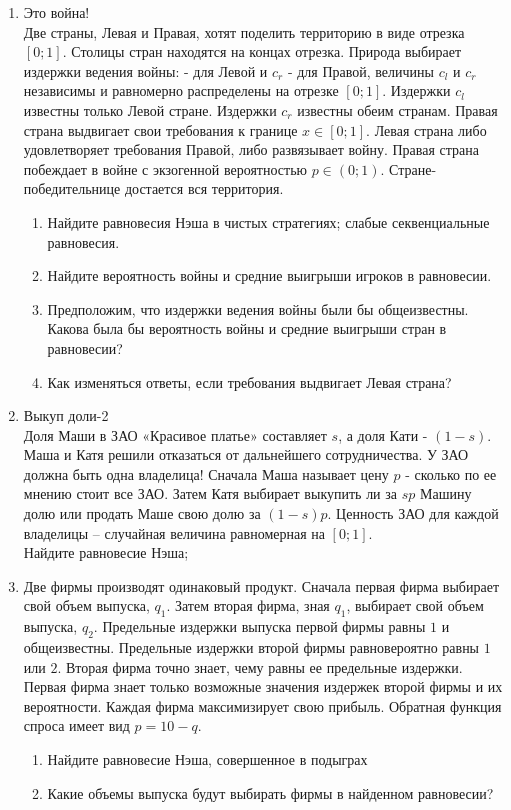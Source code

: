 \documentclass[pdftex,12pt,a4paper]{article}
\begin{document}
\begin{enumerate}
\item Это война!\\
Две страны, Левая и Правая, хотят поделить территорию в виде отрезка $\left[ {0;1} \right]$. Столицы стран находятся на концах отрезка. Природа выбирает издержки ведения войны:  - для Левой и $c_r $ - для Правой, величины $c_l $ и $c_r $ независимы и равномерно распределены на отрезке $\left[ {0;1} \right]$. Издержки $c_l $ известны только Левой стране. Издержки $c_r $ известны обеим странам. Правая страна выдвигает свои требования к границе $x \in \left[ {0;1} \right]$. Левая страна либо удовлетворяет требования Правой, либо развязывает войну. Правая страна побеждает в войне с экзогенной вероятностью $p \in \left( {0;1} \right)$. Стране-победительнице достается вся территория.\\
\begin{enumerate}
\item Найдите равновесия Нэша в чистых стратегиях; слабые секвенциальные равновесия.
\item Найдите вероятность войны и средние выигрыши игроков в равновесии.
\item Предположим, что издержки ведения войны были бы общеизвестны. Какова была бы вероятность войны и средние выигрыши стран в равновесии?
\item Как изменяться ответы, если требования выдвигает Левая страна?
\end{enumerate}

\item Выкуп доли-2\\
Доля Маши в ЗАО «Красивое платье» составляет $s$, а доля Кати - $\left( {1 - s} \right)$. Маша и Катя решили отказаться от дальнейшего сотрудничества. У ЗАО должна быть одна владелица! Сначала Маша называет цену $p$ - сколько по ее мнению стоит все ЗАО. Затем Катя выбирает выкупить ли за $sp$ Машину долю или продать Маше свою долю за $\left( {1 - s} \right)p$. 
Ценность ЗАО для каждой владелицы – случайная величина равномерная на $\left[ {0;1} \right]$.\\
Найдите равновесие Нэша;

\item Две фирмы производят одинаковый продукт. Сначала первая фирма выбирает свой объем выпуска, $q_1$. Затем вторая фирма, зная $q_1$, выбирает свой объем выпуска, $q_2$. Предельные издержки выпуска первой фирмы равны $1$ и общеизвестны. Предельные издержки второй фирмы равновероятно равны $1$ или $2$. Вторая фирма точно знает, чему равны ее предельные издержки. Первая фирма знает только возможные значения издержек второй фирмы и их вероятности. Каждая фирма максимизирует свою прибыль. Обратная функция спроса имеет вид $p=10-q$. 
\begin{enumerate}
\item Найдите равновесие Нэша, совершенное в подыграх
\item Какие объемы выпуска будут выбирать фирмы в найденном равновесии?
\end{enumerate}

\end{enumerate}
\end{document}
